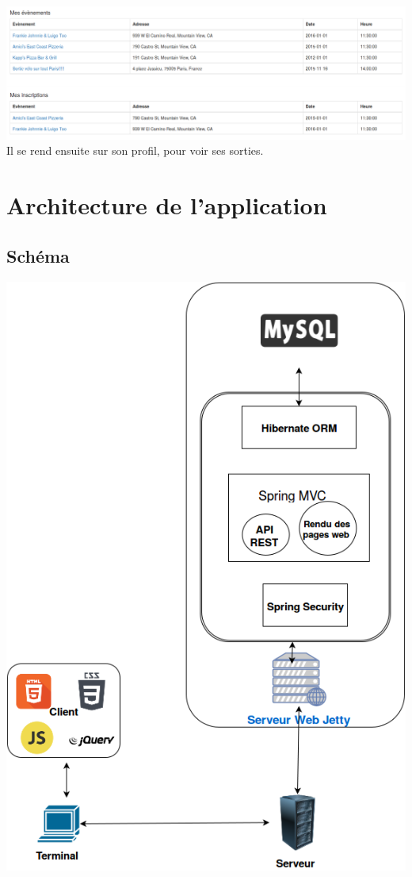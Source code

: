 \documentclass[11pt,a4paper,margin=0.5in]{report}
\begin{document}
\includegraphics[scale=0.33]{illus/prof.png} \\[0.25in]
Il se rend ensuite sur son profil, pour voir ses sorties. \\[0.25in]

\chapter{Architecture de l'application}

\section{Schéma}

\begin{center}
\includegraphics[scale=0.5]{illus/appschema.png} \\[0.25in]
\end{center}
\end{document}
